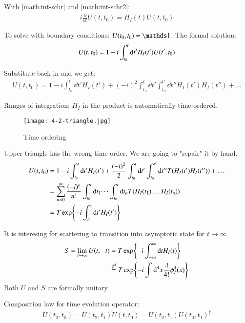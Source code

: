 With \ref{math:int-schr} and \ref{math:int-schr2}:
\begin{align}
	i\frac{\partial}{\partial t} U(t,t_0) = H_I(t)U(t,t_0)
\end{align}

To solve with boundary conditions: $U(t_0, t_0) = \id$. The formal solution:
\begin{align}
	U(t,t_0) = 1 - i \int_{t_0}^t \dd t' H_I(t')U(t',t_0) \notag
\end{align}

Substitute back in and we get:
\begin{align}
	U(t,t_0) = 1- i \int_{t_0}^t \dd t' H_I(t') + (-i)^2 \int_{t_0}^t \dd t' \int^{t'}_{t_0} \dd t'' H_I(t') H_I(t'') + \dots
\end{align}

Ranges of integration: $H_I$ in the product is automatically time-ordered.

\begin{figure}[ht]
	\centering
	\texttt{[image: 4-2-triangle.jpg]}
	\caption{Time ordering}
	\label{fig:4-2-triangle}
\end{figure}

Upper triangle has the wrong time order. We are going to "repair" it by hand.
\begin{align}
	U(t,t_0) &= 1-i\int_{t_0}^t \dd t' H_I(t') + \frac{(-i)^2}{2} \int_{t_0}^t \dd t' \int^{t'}_{t_0} \dd t'' T(H_I(t') H_I(t'')) + \dots \notag\\
			 &= \sum_{n=0}^{\infty} \frac{(-i)^n}{n!}\int_{t_0}^t \dd t_1 \dots \int_{t_0}^t \dd t_n T(H_I(t_1) \dots H_I(t_n))  \notag\\
			 &= T \exp{-i\int_{t_0}^t \dd t' H_I(t') }
\end{align}

It is interesing for scattering to transition into asymptotic state for $t \rightarrow \infty$
\begin{align}
	S = \lim_{t \rightarrow \infty} U(t,-t) &= T \exp{-i \int_{-\infty}^\infty \dd t H_I(t)} \\
	 &\stackrel{\phi^4}{=} T \exp{-i\int \dd^4 x \frac{\lambda}{4!} \phi_I^4(x)} \notag
\end{align}
Both $U$ and $S$ are formally unitary

Composition law for time evolution operator: 
\begin{align}
	U(t_2, t_0) = U(t_2, t_1) U(t,t_0) = U(t_2, t_1) U(t_0, t_1)^\dagger
\end{align}

